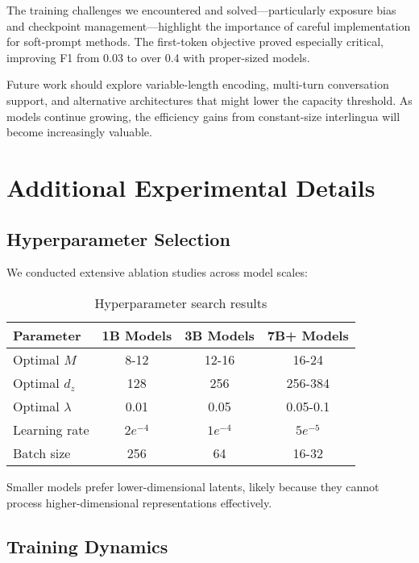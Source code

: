\documentclass{article}
\begin{document}
The training challenges we encountered and solved—particularly exposure bias and checkpoint management—highlight the importance of careful implementation for soft-prompt methods. The first-token objective proved especially critical, improving F1 from 0.03 to over 0.4 with proper-sized models.

Future work should explore variable-length encoding, multi-turn conversation support, and alternative architectures that might lower the capacity threshold. As models continue growing, the efficiency gains from constant-size interlingua will become increasingly valuable.




\appendix
\section{Additional Experimental Details}

\subsection{Hyperparameter Selection}

We conducted extensive ablation studies across model scales:

\begin{table}[h]
\caption{Hyperparameter search results}
\vskip 0.15in
\begin{center}
\begin{small}
\begin{tabular}{lccc}
\toprule
Parameter & 1B Models & 3B Models & 7B+ Models \\
\midrule
Optimal $M$ & 8-12 & 12-16 & 16-24 \\
Optimal $d_z$ & 128 & 256 & 256-384 \\
Optimal $\lambda$ & 0.01 & 0.05 & 0.05-0.1 \\
Learning rate & $2e^{-4}$ & $1e^{-4}$ & $5e^{-5}$ \\
Batch size & 256 & 64 & 16-32 \\
\bottomrule
\end{tabular}
\end{small}
\end{center}
\end{table}

Smaller models prefer lower-dimensional latents, likely because they cannot process higher-dimensional representations effectively.

\subsection{Training Dynamics}
\end{document}
